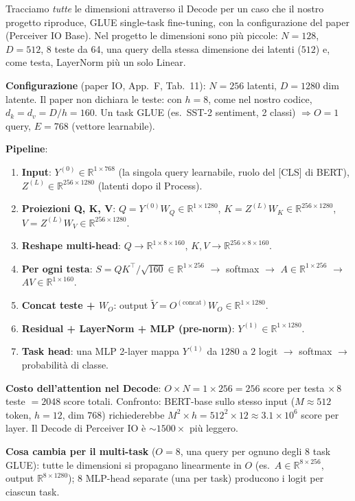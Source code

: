 \documentclass[
  11pt,
]{article}
\begin{document}
\begin{notabox}[title={\textbf{Esempio end-to-end: GLUE single-task fine-tuning (SST-2)}}]
Tracciamo \emph{tutte} le dimensioni attraverso il Decode per un caso che il nostro progetto riproduce, GLUE single-task fine-tuning, con la configurazione del paper (Perceiver IO Base). Nel progetto le dimensioni sono più piccole: $N = 128$, $D = 512$, 8 teste da 64, una query della stessa dimensione dei latenti ($512$) e, come testa, LayerNorm più un solo Linear.

\textbf{Configurazione} (paper IO, App.~F, Tab.~11):
$N = 256$ latenti, $D = 1280$ dim latente. Il paper non dichiara le teste: con $h = 8$, come nel nostro codice, $d_k = d_v = D/h = 160$. Un task GLUE (es.\ SST-2 sentiment, 2 classi) $\Rightarrow O = 1$ query, $E = 768$ (vettore learnabile).

\textbf{Pipeline}:
\begin{enumerate}\setlength\itemsep{0.15em}
\item \textbf{Input}: $Y^{(0)} \in \mathbb{R}^{1 \times 768}$ (la singola query learnabile, ruolo del [CLS] di BERT), $Z^{(L)} \in \mathbb{R}^{256 \times 1280}$ (latenti dopo il Process).
\item \textbf{Proiezioni Q, K, V}: $Q = Y^{(0)} W_Q \in \mathbb{R}^{1 \times 1280}$, $K = Z^{(L)} W_K \in \mathbb{R}^{256 \times 1280}$, $V = Z^{(L)} W_V \in \mathbb{R}^{256 \times 1280}$.
\item \textbf{Reshape multi-head}: $Q \to \mathbb{R}^{1 \times 8 \times 160}$, $K, V \to \mathbb{R}^{256 \times 8 \times 160}$.
\item \textbf{Per ogni testa}: $S = QK^\top / \sqrt{160} \in \mathbb{R}^{1 \times 256}$ $\to$ softmax $\to$ $A \in \mathbb{R}^{1 \times 256}$ $\to$ $AV \in \mathbb{R}^{1 \times 160}$.
\item \textbf{Concat teste + $W_O$}: output $\widetilde Y = O^{(\text{concat})} W_O \in \mathbb{R}^{1 \times 1280}$.
\item \textbf{Residual + LayerNorm + MLP (pre-norm)}: $Y^{(1)} \in \mathbb{R}^{1 \times 1280}$.
\item \textbf{Task head}: una MLP 2-layer mappa $Y^{(1)}$ da $1280$ a $2$ logit $\to$ softmax $\to$ probabilità di classe.
\end{enumerate}

\textbf{Costo dell'attention nel Decode}: $O \times N = 1 \times 256 = 256$ score per testa $\times\, 8$ teste $= 2048$ score totali. Confronto: BERT-base sullo stesso input ($M \approx 512$ token, $h=12$, dim $768$) richiederebbe $M^2 \times h = 512^2 \times 12 \approx 3.1 \times 10^6$ score per layer. Il Decode di Perceiver IO è $\sim 1500\times$ più leggero.

\textbf{Cosa cambia per il multi-task} ($O = 8$, una query per ognuno degli 8 task GLUE): tutte le dimensioni si propagano linearmente in $O$ (es.\ $A \in \mathbb{R}^{8 \times 256}$, output $\mathbb{R}^{8 \times 1280}$); 8 MLP-head separate (una per task) producono i logit per ciascun task.
\end{notabox}
\end{document}
